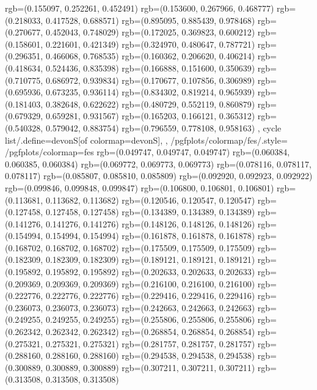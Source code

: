 {{{					rgb=(0.155097, 0.252261, 0.452491)
					rgb=(0.153600, 0.267966, 0.468777)
					rgb=(0.218033, 0.417528, 0.688571)
					rgb=(0.895095, 0.885439, 0.978468)
					rgb=(0.270677, 0.452043, 0.748029)
					rgb=(0.172025, 0.369823, 0.600212)
					rgb=(0.158601, 0.221601, 0.421349)
					rgb=(0.324970, 0.480647, 0.787721)
					rgb=(0.296351, 0.466068, 0.768535)
					rgb=(0.160362, 0.206620, 0.406214)
					rgb=(0.418634, 0.524436, 0.835398)
					rgb=(0.166888, 0.151600, 0.350639)
					rgb=(0.710775, 0.686972, 0.939834)
					rgb=(0.170677, 0.107856, 0.306989)
					rgb=(0.695936, 0.673235, 0.936114)
					rgb=(0.834302, 0.819214, 0.965939)
					rgb=(0.181403, 0.382648, 0.622622)
					rgb=(0.480729, 0.552119, 0.860879)
					rgb=(0.679329, 0.659281, 0.931567)
					rgb=(0.165203, 0.166121, 0.365312)
					rgb=(0.540328, 0.579042, 0.883754)
					rgb=(0.796559, 0.778108, 0.958163)
			},
		cycle list/.define={devonS}{[of colormap=devonS]},
		},
		/pgfplots/colormap/fes/.style={
			/pgfplots/colormap={fes}{%
					rgb=(0.049747, 0.049747, 0.049747)
					rgb=(0.060384, 0.060385, 0.060384)
					rgb=(0.069772, 0.069773, 0.069773)
					rgb=(0.078116, 0.078117, 0.078117)
					rgb=(0.085807, 0.085810, 0.085809)
					rgb=(0.092920, 0.092923, 0.092922)
					rgb=(0.099846, 0.099848, 0.099847)
					rgb=(0.106800, 0.106801, 0.106801)
					rgb=(0.113681, 0.113682, 0.113682)
					rgb=(0.120546, 0.120547, 0.120547)
					rgb=(0.127458, 0.127458, 0.127458)
					rgb=(0.134389, 0.134389, 0.134389)
					rgb=(0.141276, 0.141276, 0.141276)
					rgb=(0.148126, 0.148126, 0.148126)
					rgb=(0.154994, 0.154994, 0.154994)
					rgb=(0.161878, 0.161878, 0.161878)
					rgb=(0.168702, 0.168702, 0.168702)
					rgb=(0.175509, 0.175509, 0.175509)
					rgb=(0.182309, 0.182309, 0.182309)
					rgb=(0.189121, 0.189121, 0.189121)
					rgb=(0.195892, 0.195892, 0.195892)
					rgb=(0.202633, 0.202633, 0.202633)
					rgb=(0.209369, 0.209369, 0.209369)
					rgb=(0.216100, 0.216100, 0.216100)
					rgb=(0.222776, 0.222776, 0.222776)
					rgb=(0.229416, 0.229416, 0.229416)
					rgb=(0.236073, 0.236073, 0.236073)
					rgb=(0.242663, 0.242663, 0.242663)
					rgb=(0.249255, 0.249255, 0.249255)
					rgb=(0.255806, 0.255806, 0.255806)
					rgb=(0.262342, 0.262342, 0.262342)
					rgb=(0.268854, 0.268854, 0.268854)
					rgb=(0.275321, 0.275321, 0.275321)
					rgb=(0.281757, 0.281757, 0.281757)
					rgb=(0.288160, 0.288160, 0.288160)
					rgb=(0.294538, 0.294538, 0.294538)
					rgb=(0.300889, 0.300889, 0.300889)
					rgb=(0.307211, 0.307211, 0.307211)
					rgb=(0.313508, 0.313508, 0.313508)
}}}
